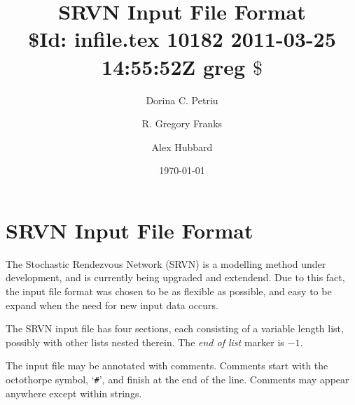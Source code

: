 \documentclass{article}
\begin{document}
\title{SRVN Input File Format\\ {\small\rm\$Id: infile.tex 10182 2011-03-25 14:55:52Z greg $\$$}}
\author {Dorina C. Petriu \and R. Gregory Franks \and Alex Hubbard}
\date{\today} 
\maketitle

\section{SRVN Input File Format}
The Stochastic Rendezvous Network (SRVN) is a modelling method under
development, and is currently being upgraded and extendend. Due to
this fact, the input file format was chosen to be as flexible as
possible, and easy to be expand when the need for new input data
occurs.

The SRVN input file has four sections, each consisting of a variable
length list, possibly with other lists nested therein.  The {\em end
of list} marker is $-1$.

The input file may be annotated with comments.
Comments start with the octothorpe symbol, `{\tt \#}', and finish at the
end of the line.  Comments may appear anywhere except within strings.
\end{document}
